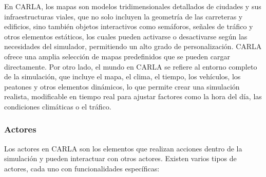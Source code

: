 En CARLA, los mapas son modelos tridimensionales detallados de ciudades y sus infraestructuras viales, que no solo incluyen la geometría de las carreteras y edificios, sino también objetos interactivos como semáforos, señales de tráfico y otros elementos estáticos, los cuales pueden activarse o desactivarse según las necesidades del simulador, permitiendo un alto grado de personalización. CARLA ofrece una amplia selección de mapas predefinidos que se pueden cargar directamente. Por otro lado, el mundo en CARLA se refiere al entorno completo de la simulación, que incluye el mapa, el clima, el tiempo, los vehículos, los peatones y otros elementos dinámicos, lo que permite crear una simulación realista, modificable en tiempo real para ajustar factores como la hora del día, las condiciones climáticas o el tráfico.

\subsubsection{Actores}

Los actores en CARLA son los elementos que realizan acciones dentro de la simulación y pueden interactuar con otros actores. Existen varios tipos de actores, cada uno con funcionalidades específicas:


